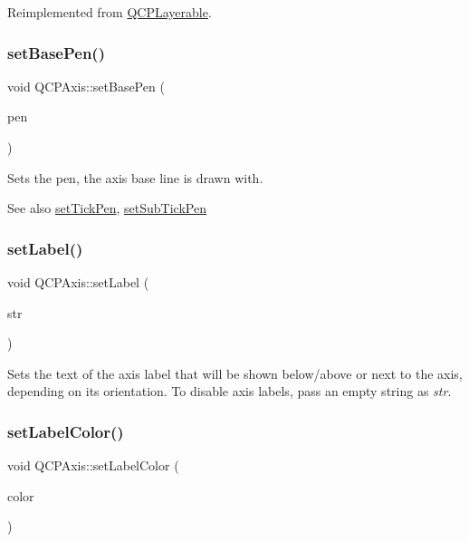 Reimplemented from \hyperlink{class_q_c_p_layerable_a04db8351fefd44cfdb77958e75c6288e}{Q\+C\+P\+Layerable}.

\mbox{\label{class_q_c_p_axis_a778d45fb71b3c7ab3bb7079e18b058e4}} 
\subsubsection{\texorpdfstring{set\+Base\+Pen()}{setBasePen()}}
{\footnotesize\ttfamily void Q\+C\+P\+Axis\+::set\+Base\+Pen (\begin{DoxyParamCaption}\item[{const Q\+Pen \&}]{pen }\end{DoxyParamCaption})}

Sets the pen, the axis base line is drawn with.

\begin{DoxySeeAlso}{See also}
\hyperlink{class_q_c_p_axis_ad80923bcc1c5da4c4db602c5325e797e}{set\+Tick\+Pen}, \hyperlink{class_q_c_p_axis_aede4028ae7516bd51a60618a8233f9cf}{set\+Sub\+Tick\+Pen} 
\end{DoxySeeAlso}
\mbox{\label{class_q_c_p_axis_a33bcc382c111c9f31bb0687352a2dea4}} 
\subsubsection{\texorpdfstring{set\+Label()}{setLabel()}}
{\footnotesize\ttfamily void Q\+C\+P\+Axis\+::set\+Label (\begin{DoxyParamCaption}\item[{const Q\+String \&}]{str }\end{DoxyParamCaption})}

Sets the text of the axis label that will be shown below/above or next to the axis, depending on its orientation. To disable axis labels, pass an empty string as {\itshape str}. \mbox{\label{class_q_c_p_axis_a6c906fe56d75f0122335b9f79b999608}} 
\subsubsection{\texorpdfstring{set\+Label\+Color()}{setLabelColor()}}
{\footnotesize\ttfamily void Q\+C\+P\+Axis\+::set\+Label\+Color (\begin{DoxyParamCaption}\item[{const Q\+Color \&}]{color }\end{DoxyParamCaption})}

